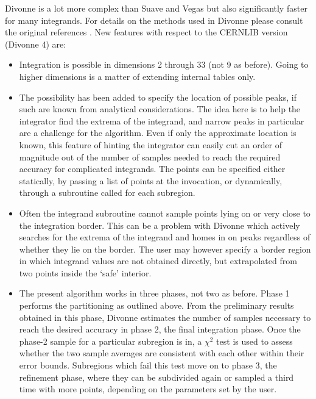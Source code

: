 \documentclass[12pt]{article}
\begin{document}
Divonne is a lot more complex than Suave and Vegas but also
significantly faster for many integrands.  For details on the methods
used in Divonne please consult the original references \cite{Divonne}. 
New features with respect to the CERNLIB version (Divonne 4) are:
\begin{itemize}
\item
Integration is possible in dimensions 2 through 33 (not 9 as before).  
Going to higher dimensions is a matter of extending internal tables 
only.

\item
The possibility has been added to specify the location of possible
peaks, if such are known from analytical considerations.  The idea here
is to help the integrator find the extrema of the integrand, and narrow
peaks in particular are a challenge for the algorithm.  Even if only the
approximate location is known, this feature of hinting the integrator
can easily cut an order of magnitude out of the number of samples needed
to reach the required accuracy for complicated integrands.  The points
can be specified either statically, by passing a list of points at the
invocation, or dynamically, through a subroutine called for each
subregion.

\item
Often the integrand subroutine cannot sample points lying on or very
close to the integration border.  This can be a problem with Divonne
which actively searches for the extrema of the integrand and homes in on
peaks regardless of whether they lie on the border.  The user may 
however specify a border region in which integrand values are not 
obtained directly, but extrapolated from two points inside the `safe' 
interior.

\item
The present algorithm works in three phases, not two as before.  Phase 1
performs the partitioning as outlined above.  From the preliminary
results obtained in this phase, Divonne estimates the number of samples
necessary to reach the desired accuracy in phase 2, the final
integration phase.  Once the phase-2 sample for a particular subregion
is in, a $\chi^2$ test is used to assess whether the two sample averages
are consistent with each other within their error bounds.  Subregions
which fail this test move on to phase 3, the refinement phase, where
they can be subdivided again or sampled a third time with more points,
depending on the parameters set by the user.


\end{itemize}
\end{document}
